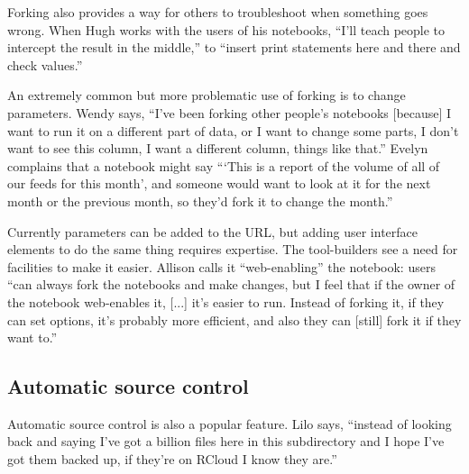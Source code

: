 Forking also provides a way for others to troubleshoot when something goes
wrong.  When Hugh works with the users of his notebooks, ``I'll teach people
to intercept the result in the middle,'' to ``insert print statements here and
there and check values.''



An extremely common but more problematic use of forking is to change
parameters. Wendy says, ``I've been forking other people's notebooks [because] I
want to run it on a different part of data, or I want to change some parts,
I don't want to see this column, I want a different column, things like
that.''  Evelyn complains that a notebook might say ```This is a report of
the volume of all of our feeds for this month', and someone would want to
look at it for the next month or the previous month, so they'd fork it to
change the month.''

Currently parameters can be added to the URL, but adding user interface
elements to do the same thing requires expertise. The tool-builders see a
need for facilities to make it easier. Allison calls it ``web-enabling'' the
notebook: users ``can always fork the notebooks and make changes, but I
feel that if the owner of the notebook web-enables it, [...] it's easier to
run. Instead of forking it, if they can set options, it's probably more
efficient, and also they can [still] fork it if they want to.''


\subsection{Automatic source control}

Automatic source control is also a popular feature. Lilo says, ``instead of
looking back and saying I've got a billion files here in this subdirectory and I
hope I've got them backed up, if they're on RCloud I know they are.''

